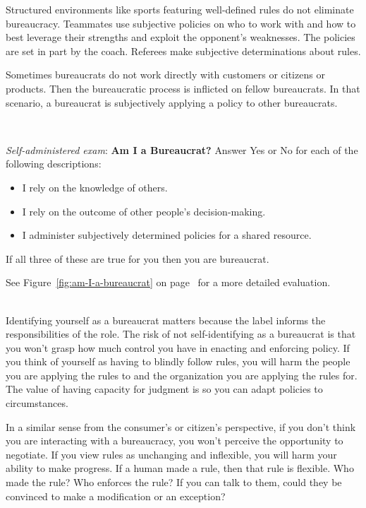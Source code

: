 Structured environments like sports featuring well-defined rules do not eliminate bureaucracy. Teammates use subjective policies on who to work with and how to best leverage their strengths and exploit the opponent's weaknesses. The policies are set in part by the coach. Referees make subjective determinations about rules.

Sometimes bureaucrats do not work directly with customers or citizens or products. Then the bureaucratic process is inflicted on fellow bureaucrats. In that scenario, a bureaucrat is subjectively applying a policy to other bureaucrats. 

\ \\


\begin{quizbox}{
      \textit{Self-administered exam}: 
      \textbf{Am I a Bureaucrat?}
}
Answer Yes or No for each of the following descriptions:
\begin{itemize}
    \item I rely on the knowledge of others. 
    \item I rely on the outcome of other people's decision-making. 
    \item I administer subjectively determined policies for a shared resource. 
\end{itemize}
If all three of these are true for you then you are bureaucrat.
\end{quizbox} 
See Figure~\ref{fig:am-I-a-bureaucrat} on page~\pageref{fig:am-I-a-bureaucrat} for a more detailed evaluation.

\ \\

Identifying yourself as a bureaucrat matters because the label informs the responsibilities of the role. The risk of not self-identifying as a bureaucrat is that you won't grasp how much control you have in enacting and enforcing policy. If you think of yourself as having to blindly follow rules, you will harm the people you are applying the rules to and the organization you are applying the rules for. The value of having capacity for judgment is so you can adapt policies to circumstances. 

In a similar sense from the consumer's or citizen's perspective, if you don't think you are interacting with a bureaucracy, you won't perceive the opportunity to negotiate.  If you view rules as unchanging and inflexible, you will harm your ability to make progress. If a human made a rule, then that rule is flexible. Who made the rule? Who enforces the rule? If you can talk to them, could they be convinced to make a modification or an exception?

